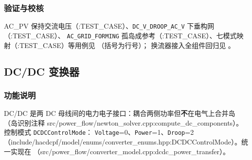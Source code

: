 \subsubsection*{验证与校核}
AC\_PV 保持交流电压（:TEST\_CASE）、\texttt{DC\_V\_DROOP\_AC\_V} 下垂构网（:TEST\_CASE）、
\texttt{AC\_GRID\_FORMING} 孤岛成参考（:TEST\_CASE）、七模式映射（:TEST\_CASE）等用例见
（括号为行号）；
换流器接入全组件回归见 。

\subsection{DC/DC 变换器}\label{sec:hybrid-dcdc}


\subsubsection*{功能说明}
DC/DC 是两 DC 母线间的电力电子接口：耦合两侧功率但\textbf{不}在电气上合并岛
（岛识别注释 src/power\_flow/newton\_solver.cpp:compute\_dc\_components）。控制模式 \texttt{DCDCControlMode}：
\texttt{Voltage}=0、\texttt{Power}=1、\texttt{Droop}=2
（include/hacdcpf/model/enums/converter\_enums.hpp:DCDCControlMode）。统一实现在
（src/power\_flow/converter\_model.cpp:dcdc\_power\_transfer）。

